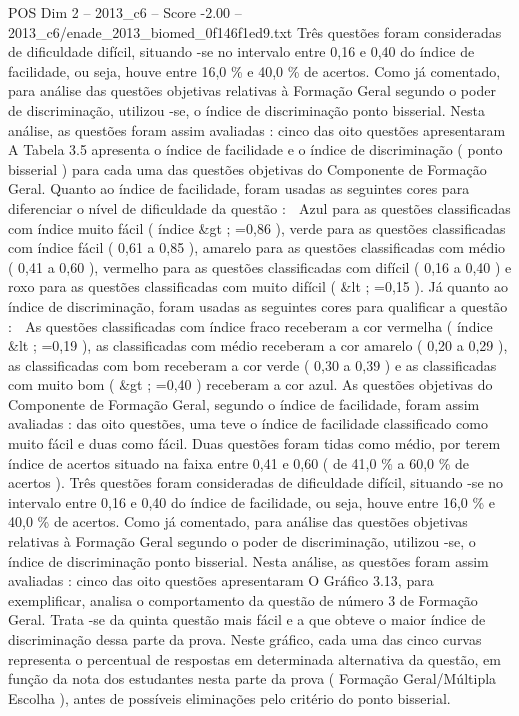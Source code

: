 \begin{textsample}{POS Dim 2 – 2013\_c6 – Score -2.00 – 2013\_c6/enade\_2013\_biomed\_0f146f1ed9.txt}
Três questões foram consideradas de dificuldade difícil, situando -se no intervalo entre 0,16 e 0,40 do índice de facilidade, ou seja, houve entre 16,0 \% e 40,0 \% de acertos.
Como já comentado, para análise das questões objetivas relativas à Formação Geral segundo o poder de discriminação, utilizou -se, o índice de discriminação ponto bisserial.
Nesta análise, as questões foram assim avaliadas : cinco das oito questões apresentaram A Tabela 3.5 apresenta o índice de facilidade e o índice de discriminação ( ponto bisserial ) para cada uma das questões objetivas do Componente de Formação Geral.
Quanto ao índice de facilidade, foram usadas as seguintes cores para diferenciar o nível de dificuldade da questão :  Azul para as questões classificadas com índice muito fácil ( índice \&gt ; =0,86 ), verde para as questões classificadas com índice fácil ( 0,61 a 0,85 ), amarelo para as questões classificadas com médio ( 0,41 a 0,60 ), vermelho para as questões classificadas com difícil ( 0,16 a 0,40 ) e roxo para as questões classificadas com muito difícil ( \&lt ; =0,15 ).
Já quanto ao índice de discriminação, foram usadas as seguintes cores para qualificar a questão :  As questões classificadas com índice fraco receberam a cor vermelha ( índice \&lt ; =0,19 ), as classificadas com médio receberam a cor amarelo ( 0,20 a 0,29 ), as classificadas com bom receberam a cor verde ( 0,30 a 0,39 ) e as classificadas com muito bom ( \&gt ; =0,40 ) receberam a cor azul.
As questões objetivas do Componente de Formação Geral, segundo o índice de facilidade, foram assim avaliadas : das oito questões, uma teve o índice de facilidade classificado como muito fácil e duas como fácil.
Duas questões foram tidas como médio, por terem índice de acertos situado na faixa entre 0,41 e 0,60 ( de 41,0 \% a 60,0 \% de acertos ).
Três questões foram consideradas de dificuldade difícil, situando -se no intervalo entre 0,16 e 0,40 do índice de facilidade, ou seja, houve entre 16,0 \% e 40,0 \% de acertos.
Como já comentado, para análise das questões objetivas relativas à Formação Geral segundo o poder de discriminação, utilizou -se, o índice de discriminação ponto bisserial.
Nesta análise, as questões foram assim avaliadas : cinco das oito questões apresentaram O Gráfico 3.13, para exemplificar, analisa o comportamento da questão de número 3 de Formação Geral.
Trata -se da quinta questão mais fácil e a que obteve o maior índice de discriminação dessa parte da prova.
Neste gráfico, cada uma das cinco curvas representa o percentual de respostas em determinada alternativa da questão, em função da nota dos estudantes nesta parte da prova ( Formação Geral/Múltipla Escolha ), antes de possíveis eliminações pelo critério do ponto bisserial.

\end{textsample}
